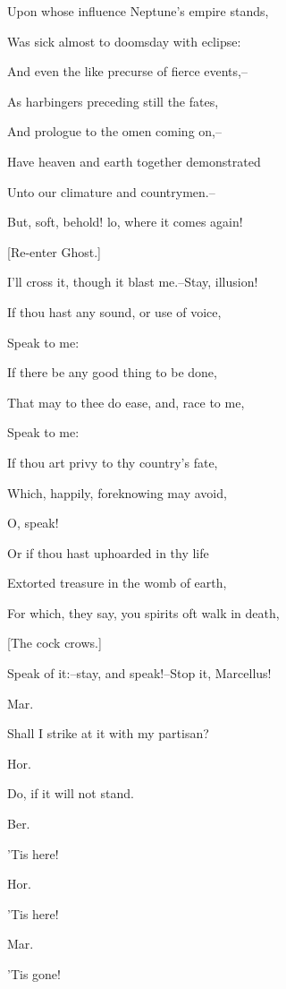 \documentclass[12pt]{book}
\begin{document}
Upon whose influence Neptune's empire stands,

Was sick almost to doomsday with eclipse:

And even the like precurse of fierce events,--

As harbingers preceding still the fates,

And prologue to the omen coming on,--

Have heaven and earth together demonstrated

Unto our climature and countrymen.--

But, soft, behold! lo, where it comes again!



[Re-enter Ghost.]



I'll cross it, though it blast me.--Stay, illusion!

If thou hast any sound, or use of voice,

Speak to me:

If there be any good thing to be done,

That may to thee do ease, and, race to me,

Speak to me:

If thou art privy to thy country's fate,

Which, happily, foreknowing may avoid,

O, speak!

Or if thou hast uphoarded in thy life

Extorted treasure in the womb of earth,

For which, they say, you spirits oft walk in death,

[The cock crows.]

Speak of it:--stay, and speak!--Stop it, Marcellus!



Mar.

Shall I strike at it with my partisan?



Hor.

Do, if it will not stand.



Ber.

'Tis here!



Hor.

'Tis here!



Mar.

'Tis gone!
\end{document}
